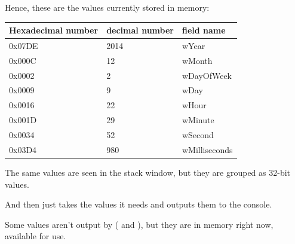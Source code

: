 Hence, these are the values currently stored in memory:

\begin{center}
\begin{tabular}{ | l | l | l | }
\hline
\headercolor{} Hexadecimal number & 
\headercolor{} decimal number & 
\headercolor{} field name \\
\hline
0x07DE & 2014	& wYear \\
\hline
0x000C & 12	& wMonth \\
\hline
0x0002 & 2	& wDayOfWeek \\
\hline
0x0009 & 9	& wDay \\
\hline
0x0016 & 22	& wHour \\
\hline
0x001D & 29	& wMinute \\
\hline
0x0034 & 52	& wSecond \\
\hline	
0x03D4 & 980	& wMilliseconds \\
\hline
\end{tabular}
\end{center}

The same values are seen in the stack window, but they are grouped as 32-bit values.

And then \printf just takes the values it needs and outputs them to the console.

Some values aren't output by \printf  ( and ), 
but they are in memory right now, available for use.

